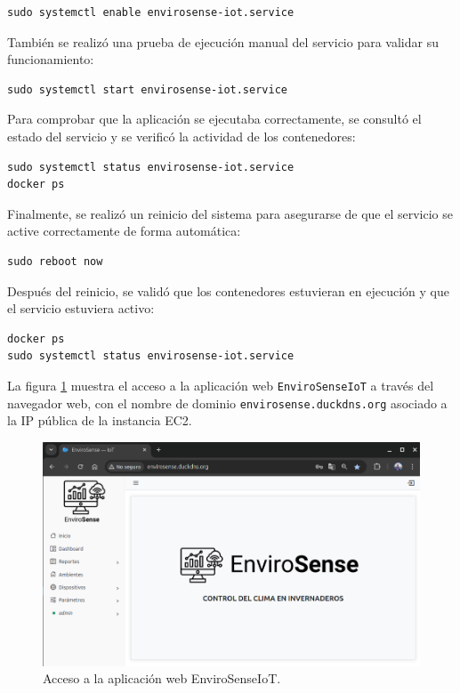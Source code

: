 \begin{verbatim}
sudo systemctl enable envirosense-iot.service
\end{verbatim}

También se realizó una prueba de ejecución manual del servicio para validar su
funcionamiento:

\begin{verbatim}
sudo systemctl start envirosense-iot.service
\end{verbatim}

Para comprobar que la aplicación se ejecutaba correctamente, se consultó el
estado del servicio y se verificó la actividad de los contenedores:

\begin{verbatim}
sudo systemctl status envirosense-iot.service
docker ps
\end{verbatim}

Finalmente, se realizó un reinicio del sistema para asegurarse de que el
servicio se active correctamente de forma automática:

\begin{verbatim}
sudo reboot now
\end{verbatim}

Después del reinicio, se validó que los contenedores estuvieran en ejecución y
que el servicio estuviera activo:

\begin{verbatim}
docker ps
sudo systemctl status envirosense-iot.service
\end{verbatim}

La figura \ref{fig:aws-ec2-service} muestra el acceso a la aplicación web
\texttt{EnviroSenseIoT} a través del navegador web, con el nombre de dominio
\texttt{envirosense.duckdns.org} asociado a la IP pública de la instancia EC2.
\begin{figure}[H]
    \centering
    \includegraphics[width=\textwidth]{./Images/34-ec2-3.png}
    \caption{Acceso a la aplicación web EnviroSenseIoT.}
    \label{fig:aws-ec2-service}
\end{figure}

